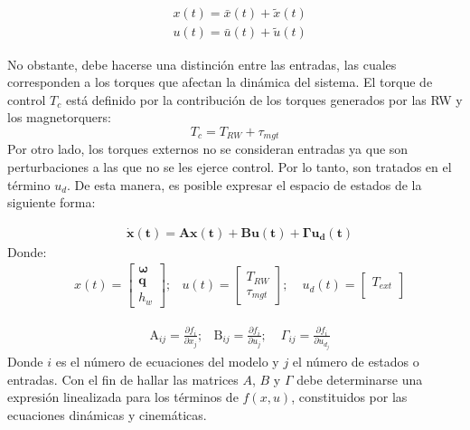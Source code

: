\begin{equation}
	\begin{aligned}
		& x(t) =\bar{x}(t)+ \tilde{x}(t) \\
		& u(t) =\bar{u}(t)+ \tilde{u}(t) 		
	\end{aligned}
\end{equation}	

No obstante, debe hacerse una distinción entre las entradas, las cuales corresponden a los torques que afectan la dinámica del sistema. El torque de control $T_c$ está definido por la contribución de los torques generados por las RW y los magnetorquers:
$$ T_c = T_{RW} +\tau_{mgt}$$
Por otro lado, los torques externos no se consideran entradas ya que son perturbaciones a las que no se les ejerce control. Por lo tanto, son tratados en el término $u_d$. De esta manera, es posible expresar el espacio de estados de la siguiente forma:
 
\begin{equation}\label{eq:espacio_de_estados}
	\begin{aligned}
		& \boldsymbol{\dot{x}(t)} =\boldsymbol{Ax(t)}+ \boldsymbol{Bu(t)}+ \boldsymbol{\Gamma u_d(t)}
	\end{aligned}
\end{equation}	
\noindent Donde: 
\begin{equation}\label{eq:estados_y_entradas}
	\begin{aligned}
		& x(t) = \left[\begin{array}{c}
			\boldsymbol{\omega} \\
			\boldsymbol{q} \\
			h_{w}
		\end{array}\right];
		& u(t) = \left[\begin{array}{c}
			T_{RW} \\
			\tau_{mgt}
		\end{array}\right]; 
		&\;u_d(t) = \left[\begin{array}{c}
			T_{ext} \\		
		\end{array}\right]		
	\end{aligned}
\end{equation}

\begin{equation}
	\begin{aligned}		
		&\mathrm{A}_{ij}= \frac{\partial f_i}{\partial x_j};	
		&\mathrm{B}_{ij}= \frac{\partial f_i}{\partial u_j};	
		&\;\Gamma_{ij}= \frac{\partial f_i}{\partial u_{d_j}}				
	\end{aligned}
\end{equation}
Donde $i$ es el número de ecuaciones del modelo y $j$ el número de estados o entradas. Con el fin de hallar las matrices $A$, $B$ y $\Gamma$ debe determinarse una expresión linealizada para los términos de $f(x,u)$, constituidos por las ecuaciones dinámicas y cinemáticas.

